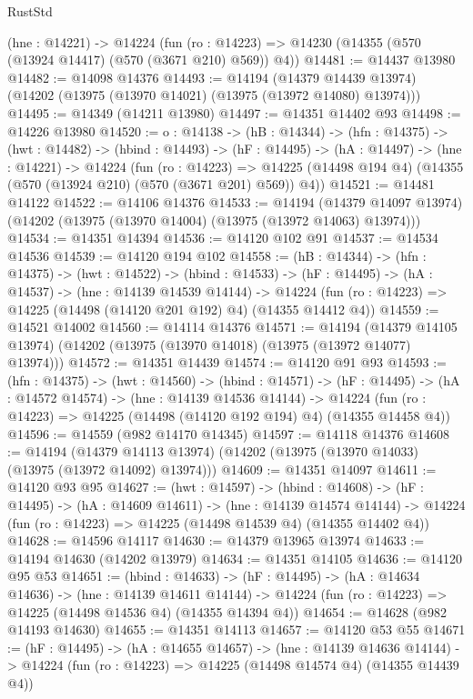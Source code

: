 \begin{lexlean}{RustStd}
\begin{coremodule}
  (hne : @14221) ->
  @14224 (fun (ro : @14223) => @14230 (@14355 (@570 (@13924 @14417) (@570 (@3671 @210) @569)) @4))
@14481 := @14437 @13980
@14482 := @14098 @14376
@14493 := @14194
    (@14379 @14439 @13974)
    (@14202 (@13975 (@13970 @14021) (@13975 (@13972 @14080) @13974)))
@14495 := @14349 (@14211 @13980)
@14497 := @14351 @14402 @93
@14498 := @14226 @13980
@14520 := {o : @14138} ->
  (hB : @14344) ->
  (hfn : @14375) ->
  (hwt : @14482) ->
  (hbind : @14493) ->
  (hF : @14495) ->
  (hA : @14497) ->
  (hne : @14221) ->
  @14224
    (fun (ro : @14223) =>
    @14225 (@14498 @194 @4) (@14355 (@570 (@13924 @210) (@570 (@3671 @201) @569)) @4))
@14521 := @14481 @14122
@14522 := @14106 @14376
@14533 := @14194
    (@14379 @14097 @13974)
    (@14202 (@13975 (@13970 @14004) (@13975 (@13972 @14063) @13974)))
@14534 := @14351 @14394
@14536 := @14120 @102 @91
@14537 := @14534 @14536
@14539 := @14120 @194 @102
@14558 := (hB : @14344) ->
  (hfn : @14375) ->
  (hwt : @14522) ->
  (hbind : @14533) ->
  (hF : @14495) ->
  (hA : @14537) ->
  (hne : @14139 @14539 @14144) ->
  @14224 (fun (ro : @14223) => @14225 (@14498 (@14120 @201 @192) @4) (@14355 @14412 @4))
@14559 := @14521 @14002
@14560 := @14114 @14376
@14571 := @14194
    (@14379 @14105 @13974)
    (@14202 (@13975 (@13970 @14018) (@13975 (@13972 @14077) @13974)))
@14572 := @14351 @14439
@14574 := @14120 @91 @93
@14593 := (hfn : @14375) ->
  (hwt : @14560) ->
  (hbind : @14571) ->
  (hF : @14495) ->
  (hA : @14572 @14574) ->
  (hne : @14139 @14536 @14144) ->
  @14224 (fun (ro : @14223) => @14225 (@14498 (@14120 @192 @194) @4) (@14355 @14458 @4))
@14596 := @14559 (@982 @14170 @14345)
@14597 := @14118 @14376
@14608 := @14194
    (@14379 @14113 @13974)
    (@14202 (@13975 (@13970 @14033) (@13975 (@13972 @14092) @13974)))
@14609 := @14351 @14097
@14611 := @14120 @93 @95
@14627 := (hwt : @14597) ->
  (hbind : @14608) ->
  (hF : @14495) ->
  (hA : @14609 @14611) ->
  (hne : @14139 @14574 @14144) ->
  @14224 (fun (ro : @14223) => @14225 (@14498 @14539 @4) (@14355 @14402 @4))
@14628 := @14596 @14117
@14630 := @14379 @13965 @13974
@14633 := @14194 @14630 (@14202 @13979)
@14634 := @14351 @14105
@14636 := @14120 @95 @53
@14651 := (hbind : @14633) ->
  (hF : @14495) ->
  (hA : @14634 @14636) ->
  (hne : @14139 @14611 @14144) ->
  @14224 (fun (ro : @14223) => @14225 (@14498 @14536 @4) (@14355 @14394 @4))
@14654 := @14628 (@982 @14193 @14630)
@14655 := @14351 @14113
@14657 := @14120 @53 @55
@14671 := (hF : @14495) ->
  (hA : @14655 @14657) ->
  (hne : @14139 @14636 @14144) ->
  @14224 (fun (ro : @14223) => @14225 (@14498 @14574 @4) (@14355 @14439 @4))

\end{coremodule}
\end{lexlean}
